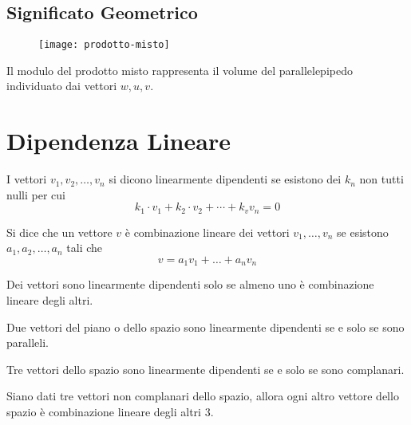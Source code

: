 \subsection{Significato Geometrico}

\begin{figure}[H]
\texttt{[image: prodotto-misto]}
\centering
\end{figure}

Il modulo del prodotto misto rappresenta il volume del parallelepipedo individuato dai vettori $w, u, v$.


\section{Dipendenza Lineare}

\begin{definition}
I vettori $v_1, v_2, \ldots, v_n$  si dicono linearmente dipendenti se esistono dei $k_n$ non tutti nulli per cui $$k_1 \cdot v_1 + k_2 \cdot v_2 + \cdots + k_v v_n = 0$$
\end{definition}

\begin{definition}
    Si dice che un vettore $v$ è combinazione lineare dei vettori $v_1, \ldots, v_n$ se esistono $a_1,a_2,\ldots,a_n$ tali che
    $$ v = a_1v_1 + \ldots + a_nv_n$$
\end{definition}

\begin{property}
Dei vettori sono linearmente dipendenti solo se almeno uno è combinazione lineare degli altri.
\end{property}


\begin{property}
Due vettori del piano o dello spazio sono linearmente dipendenti se e solo se sono paralleli.
\end{property}

\begin{property}
Tre vettori dello spazio sono linearmente dipendenti se e solo se sono complanari.
\end{property}

\begin{theorem}
Siano dati tre vettori non complanari dello spazio, allora ogni altro vettore dello spazio è combinazione lineare degli altri 3.
\end{theorem}


